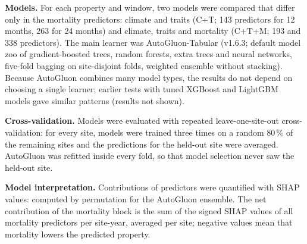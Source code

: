 \documentclass[11pt,a4paper]{article}
\begin{document}
\textbf{Models.} For each property and window, two models were compared that differ only in the mortality predictors:
climate and traits (C+T; 143 predictors for 12 months, 263 for 24 months) and climate, traits and mortality (C+T+M; 193 and 338
predictors). The main learner was AutoGluon-Tabular\cite{erickson2020autogluon} (v1.6.3; default model zoo of gradient-boosted
trees, random forests, extra trees and neural networks, five-fold bagging on site-disjoint folds, weighted ensemble without
stacking). Because AutoGluon combines many model types, the results do not depend on choosing a single learner; earlier
tests with tuned XGBoost\cite{chen2016xgboost} and LightGBM\cite{ke2017lightgbm} models gave similar patterns (results not
shown).

\textbf{Cross-validation.} Models were evaluated with repeated leave-one-site-out cross-validation: for every site, models were
trained three times on a random 80\,\% of the remaining sites and the predictions for the held-out site were averaged. AutoGluon
was refitted inside every fold, so that model selection never saw the held-out site.

\textbf{Model interpretation.} Contributions of predictors were quantified with SHAP values\cite{lundberg2017unified}: computed by
permutation for the AutoGluon ensemble. The net
contribution of the mortality block is the sum of the signed SHAP values of all mortality predictors per site-year, averaged per
site; negative values mean that mortality lowers the predicted property.
\end{document}

